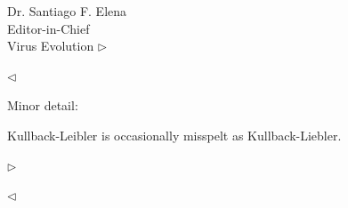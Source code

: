 \documentclass[ucla,biomath,12pt,noaddrfooter,datefrom]{UC_letter}
\newenvironment{reply}{$\triangleright$\bf}{$\triangleleft$}
\begin{document}
\begin{letter}{
Dr. Santiago F. Elena \\
Editor-in-Chief \\
Virus Evolution
}
\begin{reply}

\end{reply}

Minor detail:

Kullback-Leibler is occasionally misspelt as Kullback-Liebler.

\begin{reply}

\end{reply}



\clearpage


 
\end{letter}
\end{document}
